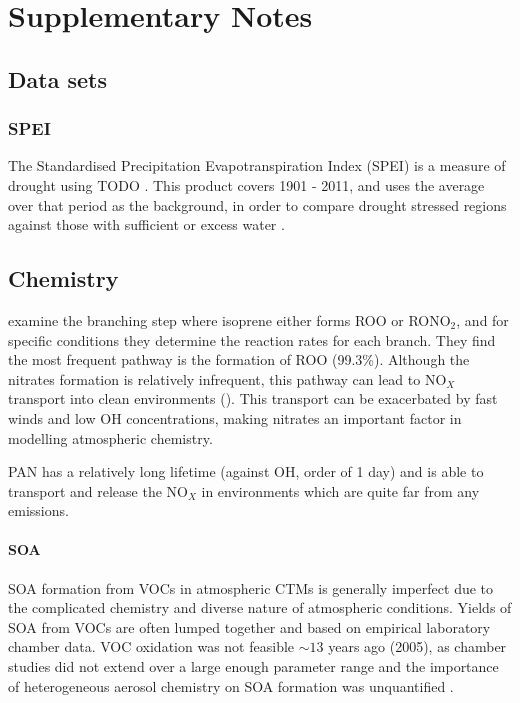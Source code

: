 
\chapter{Supplementary Notes}
  \label{SuppNotes}

\section{Data sets}
  \subsection{SPEI}
    
    The Standardised Precipitation Evapotranspiration Index (SPEI) is a measure of drought using TODO \textcite{SPEI_website}.
    This product covers 1901 - 2011, and uses the average over that period as the background, in order to compare drought stressed regions against those with sufficient or excess water \textcite{SPEI_website}.

\section{Chemistry}
  
  \cite{Patchen2007} examine the branching step where isoprene either forms ROO or RONO$_2$, and for specific conditions they determine the reaction rates for each branch.
  They find the most frequent pathway is the formation of ROO (99.3\%).
  Although the nitrates formation is relatively infrequent, this pathway can lead to NO$_X$ transport into clean environments (\cite{Horowitz1998}).
  This transport can be exacerbated by fast winds and low OH concentrations, making nitrates an important factor in modelling atmospheric chemistry.
  
  PAN has a relatively long lifetime (against OH, order of 1 day) and is able to transport and release the NO$_X$ in environments which are quite far from any emissions.
  
  \subsubsection{SOA}
    \label{LR:VOCs:IsopCascade:SOA}
    
    SOA formation from VOCs in atmospheric CTMs is generally imperfect due to the complicated chemistry and diverse nature of atmospheric conditions.
    Yields of SOA from VOCs are often lumped together and based on empirical laboratory chamber data. 
    VOC oxidation was not feasible $\sim 13$ years ago (2005), as chamber studies did not extend over a large enough parameter range and the importance of heterogeneous aerosol chemistry on SOA formation was unquantified \citep{Kanakidou2005}.
    
